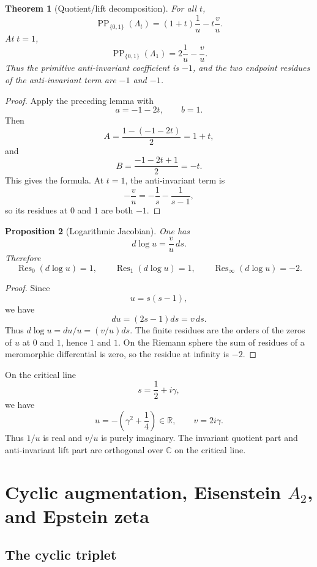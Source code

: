 \documentclass[11pt]{article}
\newtheorem{theorem}{Theorem}[section]
\newtheorem{proposition}[theorem]{Proposition}
\DeclareMathOperator{\Res}{Res}
\newcommand{\RR}{\mathbb R}
\newcommand{\CC}{\mathbb C}
\begin{document}
\begin{theorem}[Quotient/lift decomposition]
For all $t$,
\[
        \operatorname{PP}_{\{0,1\}}(\Lambda_t)
        =(1+t)\frac1u-t\frac vu.
\]
At $t=1$,
\[
        \operatorname{PP}_{\{0,1\}}(\Lambda_1)
        =2\frac1u-\frac vu.
\]
Thus the primitive anti-invariant coefficient is $-1$, and the two endpoint residues of the anti-invariant term are $-1$ and $-1$.
\end{theorem}

\begin{proof}
Apply the preceding lemma with
\[
        a=-1-2t,
        \qquad b=1.
\]
Then
\[
        A=\frac{1-(-1-2t)}2=1+t,
\]
and
\[
        B=\frac{-1-2t+1}{2}=-t.
\]
This gives the formula.  At $t=1$, the anti-invariant term is
\[
        -\frac vu=-\frac1s-\frac1{s-1},
\]
so its residues at $0$ and $1$ are both $-1$.
\end{proof}

\begin{proposition}[Logarithmic Jacobian]
One has
\[
        d\log u=\frac vu\,ds.
\]
Therefore
\[
        \Res_0(d\log u)=1,
        \qquad
        \Res_1(d\log u)=1,
        \qquad
        \Res_\infty(d\log u)=-2.
\]
\end{proposition}

\begin{proof}
Since
\[
        u=s(s-1),
\]
we have
\[
        du=(2s-1)ds=v\,ds.
\]
Thus $d\log u=du/u=(v/u)ds$.  The finite residues are the orders of the zeros of $u$ at $0$ and $1$, hence $1$ and $1$.  On the Riemann sphere the sum of residues of a meromorphic differential is zero, so the residue at infinity is $-2$.
\end{proof}

On the critical line
\[
        s=\frac12+i\gamma,
\]
we have
\[
        u=-\left(\gamma^2+\frac14\right)\in\RR,
        \qquad
        v=2i\gamma.
\]
Thus $1/u$ is real and $v/u$ is purely imaginary.  The invariant quotient part and anti-invariant lift part are orthogonal over $\CC$ on the critical line.

\section{Cyclic augmentation, Eisenstein $A_2$, and Epstein zeta}

\subsection{The cyclic triplet}
\end{document}
